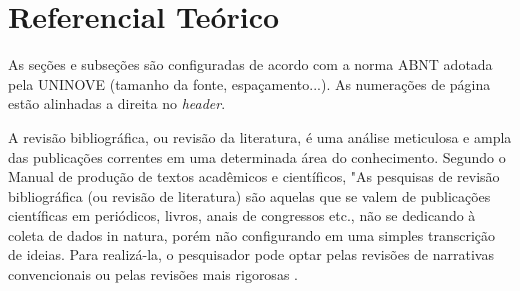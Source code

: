 \chapter{Referencial Teórico}\label{chp:21_literatura}

\begin{resumocapitulo}
As seções e subseções são configuradas de acordo com a norma ABNT adotada pela UNINOVE (tamanho da fonte, espaçamento...). As numerações de página estão alinhadas a direita no \textit{header}.
\end{resumocapitulo}

A revisão bibliográfica, ou revisão da literatura, é uma análise meticulosa e ampla das publicações correntes em uma determinada área do conhecimento. Segundo o Manual de produção de textos acadêmicos e científicos, "As pesquisas de revisão bibliográfica (ou revisão de literatura) são aquelas que se valem de publicações científicas em periódicos, livros, anais de congressos etc., não se dedicando à coleta de dados in natura, porém não configurando em uma simples transcrição de ideias. Para realizá-la, o pesquisador pode optar pelas revisões de narrativas convencionais ou pelas revisões mais rigorosas \cite{wiki:xxx}.

